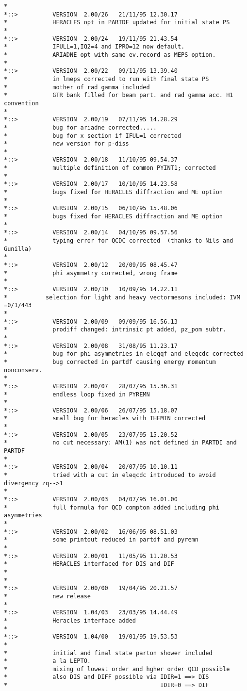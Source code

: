 \documentclass[10pt]{article} \usepackage{dina4}
\begin{document}
\begin{verbatim}
*
*::>          VERSION  2.00/26   21/11/95 12.30.17
*             HERACLES opt in PARTDF updated for initial state PS
*
*::>          VERSION  2.00/24   19/11/95 21.43.54
*             IFULL=1,IQ2=4 and IPRO=12 now default.
*             ARIADNE opt with same ev.record as MEPS option.
*
*::>          VERSION  2.00/22   09/11/95 13.39.40
*             in lmeps corrected to run with final state PS
*             mother of rad gamma included
*             GTR bank filled for beam part. and rad gamma acc. H1 convention
*
*::>          VERSION  2.00/19   07/11/95 14.28.29
*             bug for ariadne corrected.....
*             bug for x section if IFUL=1 corrected
*             new version for p-diss
*
*::>          VERSION  2.00/18   11/10/95 09.54.37
*             multiple definition of common PYINT1; corrected
*
*::>          VERSION  2.00/17   10/10/95 14.23.58
*             bugs fixed for HERACLES diffraction and ME option
*
*::>          VERSION  2.00/15   06/10/95 15.48.06
*             bugs fixed for HERACLES diffraction and ME option
*
*::>          VERSION  2.00/14   04/10/95 09.57.56
*             typing error for QCDC corrected  (thanks to Nils and Gunilla)
*
*::>          VERSION  2.00/12   20/09/95 08.45.47
*             phi asymmetry corrected, wrong frame
*
*::>          VERSION  2.00/10   10/09/95 14.22.11
*	        selection for light and heavy vectormesons included: IVM =0/1/443
*
*::>          VERSION  2.00/09   09/09/95 16.56.13
*             prodiff changed: intrinsic pt added, pz_pom subtr.
*
*::>          VERSION  2.00/08   31/08/95 11.23.17
*             bug for phi asymmetries in eleqqf and eleqcdc corrected
*             bug corrected in partdf causing energy momentum nonconserv.
*
*::>          VERSION  2.00/07   28/07/95 15.36.31
*             endless loop fixed in PYREMN
*
*::>          VERSION  2.00/06   26/07/95 15.18.07
*             small bug for heracles with THEMIN corrected
*
*::>          VERSION  2.00/05   23/07/95 15.20.52
*             no cut necessary: AM(1) was not defined in PARTDI and PARTDF
*
*::>          VERSION  2.00/04   20/07/95 10.10.11
*             tried with a cut in eleqcdc introduced to avoid divergency zq-->1
*
*::>          VERSION  2.00/03   04/07/95 16.01.00
*             full formula for QCD compton added including phi asymmetries
*
*::>          VERSION  2.00/02   16/06/95 08.51.03
*             some printout reduced in partdf and pyremn
*
*::>          VERSION  2.00/01   11/05/95 11.20.53
*             HERACLES interfaced for DIS and DIF
*
*
*::>          VERSION  2.00/00   19/04/95 20.21.57
*             new release
*
*::>          VERSION  1.04/03   23/03/95 14.44.49
*             Heracles interface added
*
*::>          VERSION  1.04/00   19/01/95 19.53.53
*
*             initial and final state parton shower included
*             a la LEPTO.
*             mixing of lowest order and hgher order QCD possible
*             also DIS and DIFF possible via IDIR=1 ==> DIS
*                                            IDIR=0 ==> DIF


\end{verbatim}
\end{document}
